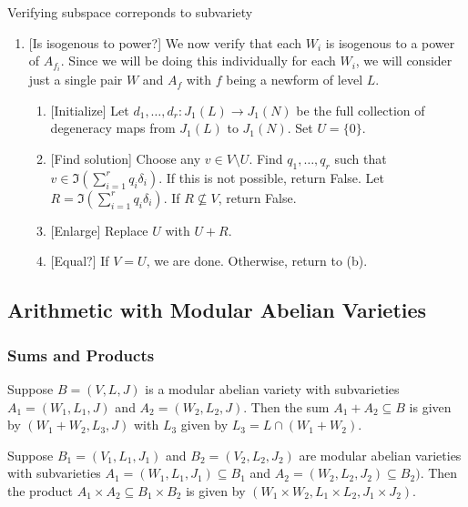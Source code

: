 \documentclass{article}
\begin{document}
\begin{algorithm}{Verifying subspace correponds to subvariety}
\begin{enumerate}
\begin{enumerate}
            \end{enumerate}
        \item{} [Is isogenous to power?]
            We now verify that each $W_i$ is isogenous to a power of $A_{f_i}$.
            Since we will be doing this individually for each $W_i$, we will
            consider just a single pair $W$ and $A_f$ with $f$ being a newform
            of level $L$.
            \begin{enumerate}
                \item{} [Initialize]
                    Let $d_1,\ldots,d_r:J_1(L)\to J_1(N)$ be the full
                    collection of degeneracy maps from $J_1(L)$ to $J_1(N)$.
                    Set $U=\{0\}$.
                \item{} [Find solution]
                    Choose any $v\in V\setminus U$. Find $q_1,\ldots,q_r$
                    such that $v\in \Im \left(\sum_{i=1} ^r q_i
                    \delta_i\right)$. If this is not possible, return
                    False. Let $R = \Im \left(\sum_{i=1} ^r q_i
                    \delta_i\right)$. If $R\not\subseteq V$, return False.  
                \item{} [Enlarge]
                    Replace $U$ with $U+R$.
                \item{} [Equal?]
                    If $V=U$, we are done. Otherwise, return to (b).
            \end{enumerate}
    \end{enumerate}
\end{algorithm}


\subsection{Arithmetic with Modular Abelian Varieties}

\subsubsection{Sums and Products}

Suppose $B=(V, L, J)$ is a modular abelian variety with subvarieties $A_1=(W_1,
L_1, J)$ and $A_2=(W_2, L_2, J)$. Then the sum $A_1+A_2\subseteq B$ is given by
$(W_1+W_2, L_3, J)$ with $L_3$ given by $L_3 = L\cap (W_1+W_2)$.

Suppose $B_1=(V_1, L_1, J_1)$ and $B_2=(V_2, L_2, J_2)$ are modular abelian
varieties with subvarieties $A_1=(W_1, L_1, J_1)\subseteq B_1$ and $A_2=(W_2,
L_2, J_2)\subseteq B_2)$. Then the product $A_1\times A_2\subseteq B_1\times
B_2$ is given by $(W_1\times W_2, L_1\times L_2, J_1\times J_2)$.
\end{document}
